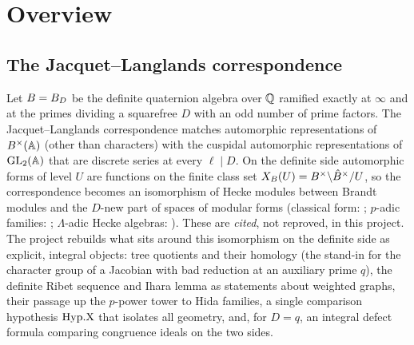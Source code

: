 \section{Overview}\label{sec:overview}

\subsection{The Jacquet--Langlands correspondence}
Let $B=B_D$ be the definite quaternion algebra over $\mathbb{Q}$ ramified exactly at $\infty$ and at the primes dividing a
squarefree $D$ with an odd number of prime factors. The Jacquet--Langlands correspondence \cite{JL} matches automorphic
representations of $B^\times(\mathbb{A})$ (other than characters) with the cuspidal automorphic representations of $\mathrm{GL}_2(\mathbb{A})$ that
are discrete series at every $\ell\mid D$. On the definite side automorphic forms of level $U$ are functions on the finite
class set $X_B(U)=B^\times\backslash\hat{B}^\times/U$, so the correspondence becomes an isomorphism of Hecke modules between
Brandt modules and the $D$-new part of spaces of modular forms (classical form: \cite{JL,Gr99}; $p$-adic families:
\cite{Ch}; $\Lambda$-adic Hecke algebras: \cite{LV,Hs}). These are \emph{cited}, not reproved, in this project.
The project rebuilds what sits around this isomorphism on the definite side as explicit, integral objects: tree quotients
and their homology (the stand-in for the character group of a Jacobian with bad reduction at an auxiliary prime $q$), the
definite Ribet sequence and Ihara lemma as statements about weighted graphs, their passage up the $p$-power tower to
Hida families, a single comparison hypothesis $\mathrm{Hyp.X}$ that isolates all geometry, and, for $D=q$, an integral defect formula
comparing congruence ideals on the two sides.


